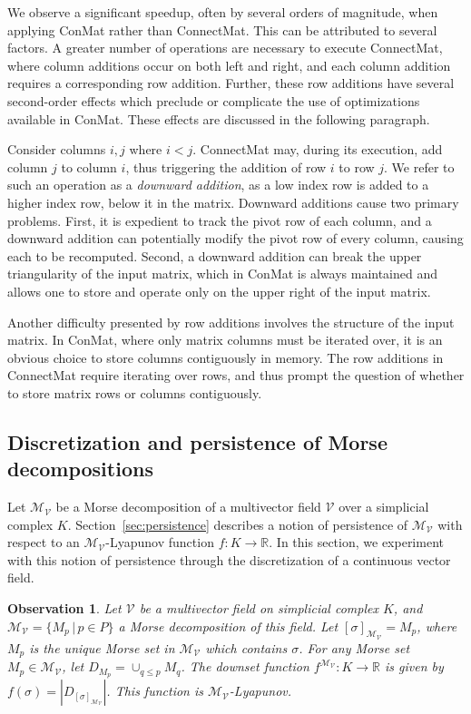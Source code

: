 \documentclass[a4paper,english,cleveref]{article}
\theoremstyle{plain}
\newtheorem{observation}{Observation}[section]
\newcounter{li}
\newcommand{\mv}{\mathcal{V}}
\newcommand{\Poset}{P}
\newcommand{\md}{\mathcal{M}}
\begin{document}
We observe a significant speedup, often by several orders of magnitude, when applying {\sc ConMat} rather than {\sc ConnectMat}. This can be attributed to several factors. A greater number of operations are necessary to execute {\sc ConnectMat}, where column additions occur on both left and right, and each column addition requires a corresponding row addition. Further, these row additions have several second-order effects which preclude or complicate the use of optimizations available in {\sc ConMat}. These effects are discussed in the following paragraph.

Consider columns $i,j$ where $i<j$. {\sc ConnectMat} may, during its execution, add column $j$ to column $i$, thus triggering the addition of row $i$ to row $j$. We refer to such an operation as a \textit{downward addition}, as a low index row is added to a higher index row, below it in the matrix. Downward additions cause two primary problems. First, it is expedient to track the pivot row of each column, and a downward addition can potentially modify the pivot row of every column, causing each to be recomputed. Second, a downward addition can break the upper triangularity of the input matrix, which in {\sc ConMat} is always maintained and allows one to store and operate only on the upper right of the input matrix.

Another difficulty presented by row additions involves the structure of the input matrix. In {\sc ConMat}, where only matrix columns must be iterated over, it is an obvious choice to store columns contiguously in memory. The row additions in {\sc ConnectMat} require iterating over rows, and thus prompt the question of whether to store matrix rows or columns contiguously.

\subsection{Discretization and persistence of Morse decompositions} \label{sec:continuous}

Let $\md_\mv$ be a Morse decomposition of a multivector field $\mv$ over a simplicial complex $K$. Section~\ref{sec:persistence} describes a notion of persistence of $\md_\mv$ with respect to an $\md_\mv$-Lyapunov function $f:K\to \mathbb{R}$. In this section, we experiment with this notion of persistence through the discretization of a continuous vector field.

\begin{observation}\label{obs:downset-lyapunov}
    Let $\mv$ be a multivector field on simplicial complex $K$, and $\md_\mv = \{M_p\,|\, p\in \Poset\}$ a Morse decomposition of this field. Let $[\sigma]_{\md_\mv} = M_p$, where $M_p$ is the unique Morse set in $\md_\mv$ which contains $\sigma$. For any Morse set $M_p \in \md_\mv$, let $D_{M_p} = \cup_{q\leq p}M_q$. The \emph{downset function} $f^{\md_\mv}: K \to \mathbb{R}$ is given by $f(\sigma) = |D_{[\sigma]_{\md_\mv}}|$. This function is $\md_\mv$-Lyapunov.
\end{observation}
\end{document}
